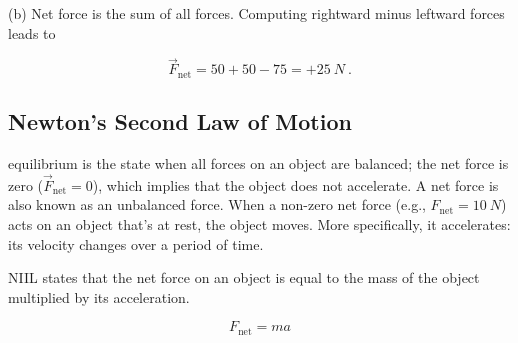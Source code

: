 \documentclass[main.tex]{subfiles}
\begin{document}
\begin{center}
    
\end{center}

(b) Net force is the sum of all forces. Computing rightward minus leftward forces leads to
\vspace{-1em}

\begin{equation*}
    \vec{F}_{\text{net}} = 50 + 50 - 75 = +\SI{25}{N}\ .
\end{equation*}

\endsolution

\vspace{1em}

\subsection{Newton's Second Law of Motion} \label{kkBUgj}

\Gls{equilibrium} is the state when all forces on an object are balanced; the net force is zero ($\vec{F}_{\text{net}} = 0$), which implies that the object does not accelerate. A net force is also known as an unbalanced force. When a non-zero net force (e.g., $F_{\text{net}} = \SI{10}{N}$) acts on an object that's at rest, the object moves. More specifically, it accelerates: its velocity changes over a period of time.


\gls{NIIL} states that the net force on an object is equal to the mass of the object multiplied by its acceleration.

\begin{equation} \label{eq:NewtonIILaw} 
    F_{\mathrm{net}} = ma
\end{equation}
\end{document}
